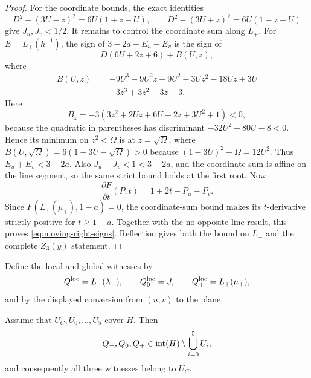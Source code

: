 \begin{proof}
For the coordinate bounds, the exact identities
\[
 D^2-(3U-z)^2=6U(1+z-U),\qquad
 D^2-(3U+z)^2=6U(1-z-U)
\]
give $J_u,J_v<1/2$.  It remains to control the coordinate sum along $L_+$.
For $E=L_+(h^{-1})$, the sign of $3-2a-E_u-E_v$ is the sign of
\[
 D(6U+2z+6)+B(U,z),
\]
where
\[
\begin{aligned}
 B(U,z)={}&-9U^3-9U^2z-9U^2-3Uz^2-18Uz+3U\\
          &-3z^3+3z^2-3z+3.
\end{aligned}
\]
Here
\[
 B_z=-3(3z^2+2Uz+6U-2z+3U^2+1)<0,
\]
because the quadratic in parentheses has discriminant
$-32U^2-80U-8<0$.  Hence its minimum on $z^2<\Omega$ is at
$z=\sqrt\Omega$, where
$B(U,\sqrt\Omega)=6(1-3U-\sqrt\Omega)>0$ because
$(1-3U)^2-\Omega=12U^2$.  Thus $E_u+E_v<3-2a$.
Also $J_u+J_v<1<3-2a$, and the coordinate sum is affine on the
line segment, so the same strict bound holds at the first root.  Now
\[
 \frac{\partial F}{\partial t}(P,t)=1+2t-P_u-P_v.
\]
Since $F(L_+(\mu_+),1-a)=0$, the coordinate-sum bound makes its $t$-derivative
strictly positive for $t\ge1-a$.  Together with the no-opposite-line result,
this proves \eqref{eq:moving-right-signs}.  Reflection gives both the bound on
$L_-$ and the complete $Z_3(y)$ statement.
\end{proof}

Define the local and global witnesses by
\begin{equation}
 Q_-^{\rm loc}=L_-(\lambda_-),\qquad
 Q_0^{\rm loc}=J,\qquad
 Q_+^{\rm loc}=L_+(\mu_+),                       \label{eq:asym-witnesses}
\end{equation}
and by the displayed conversion from $(u,v)$ to the plane.

\begin{lemma}
\label{lem:asymmetric-core-witness}
Assume that $U_C,U_0,\ldots,U_5$ cover $H$.  Then
\[
 Q_-,Q_0,Q_+
 \in\mathrm{int}(H)\setminus\bigcup_{i=0}^5U_i,
\]
and consequently all three witnesses belong to $U_C$.
\end{lemma}


